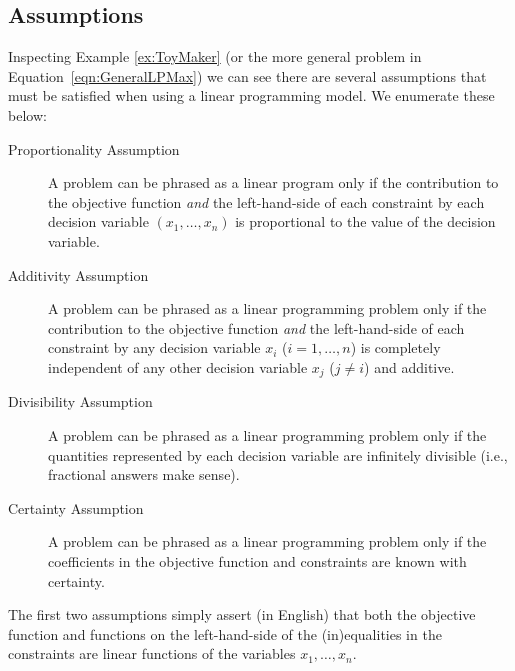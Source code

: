 
\subsection{Assumptions}
Inspecting Example \ref{ex:ToyMaker} (or the more general problem in Equation~\eqref{eqn:GeneralLPMax}) we can see there are several assumptions that must be satisfied when using a linear programming model. We enumerate these below:
\begin{description}
\item[Proportionality Assumption] A problem can be phrased as a linear program only if the contribution to the objective function \textit{and} the left-hand-side of each constraint by each decision variable $(x_1,\dots,x_n)$ is proportional to the value of the decision variable.

\item[Additivity Assumption] A problem can be phrased as a linear programming problem only if the contribution to the objective function \textit{and} the left-hand-side of each constraint by any decision variable $x_i$ ($i=1,\dots,n$) is completely independent of any other decision variable $x_j$ ($j \neq i$) and additive. 

\item[Divisibility Assumption] A problem can be phrased as a linear programming problem only if the quantities represented by each decision variable are infinitely divisible (i.e., fractional answers make sense). 

\item[Certainty Assumption] A problem can be phrased as a linear programming problem only if the coefficients in the objective function and constraints are known with certainty. 
\end{description}

The first two assumptions simply assert (in English) that both the objective function and functions on the left-hand-side of the (in)equalities in the constraints are linear functions of the variables $x_1,\dots,x_n$. 

